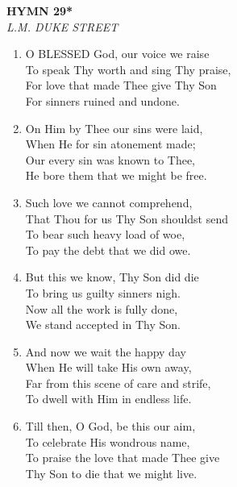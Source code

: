 \documentclass[11pt,a4paper]{article}
\begin{document}
\newpage
\begin{center}
    {\Large \textbf{HYMN 29*}}
    \\
    \textit{L.M. DUKE STREET}
\end{center}
\vspace{1em}

\begin{enumerate}
    \item O BLESSED God, our voice we raise \\
        To speak Thy worth and sing Thy praise, \\
        For love that made Thee give Thy Son \\
        For sinners ruined and undone.

    \item On Him by Thee our sins were laid, \\
        When He for sin atonement made; \\
        Our every sin was known to Thee, \\
        He bore them that we might be free.

    \item Such love we cannot comprehend, \\
        That Thou for us Thy Son shouldst send \\
        To bear such heavy load of woe, \\
        To pay the debt that we did owe.

    \item But this we know, Thy Son did die \\
        To bring us guilty sinners nigh. \\
        Now all the work is fully done, \\
        We stand accepted in Thy Son.

    \item And now we wait the happy day \\
        When He will take His own away, \\
        Far from this scene of care and strife, \\
        To dwell with Him in endless life.

    \item Till then, O God, be this our aim, \\
        To celebrate His wondrous name, \\
        To praise the love that made Thee give \\
        Thy Son to die that we might live.

\end{enumerate}
\end{document}
